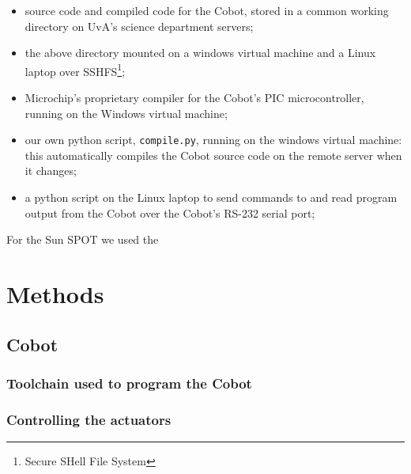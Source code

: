 \documentclass[a4paper,10pt]{article} %
\begin{document}
\begin{itemize}
    \item source code and compiled code for the Cobot, stored in a common
    working directory on UvA's science department servers;
    \item  the above directory mounted on a windows virtual machine and a Linux
    laptop over SSHFS\footnote{Secure SHell File System};
    \item Microchip's proprietary compiler for the Cobot's PIC microcontroller,
    running on the Windows virtual machine;
    \item our own python script, \texttt{compile.py}, running on the windows
    virtual machine: this automatically compiles the Cobot source code on the
    remote server when it changes;
    \item a python script on the Linux laptop to send commands to and read program
    output from the Cobot over the Cobot's RS-232 serial port;
\end{itemize}

For the Sun SPOT we used the %




\section{Methods} %

\subsection{Cobot} %



\subsubsection{Toolchain used to program the Cobot} %
\label{ssub:Toolchain used to program the Cobot}


\subsubsection{Controlling the actuators} %
\label{sub:Cobot implementation}
\end{document}
